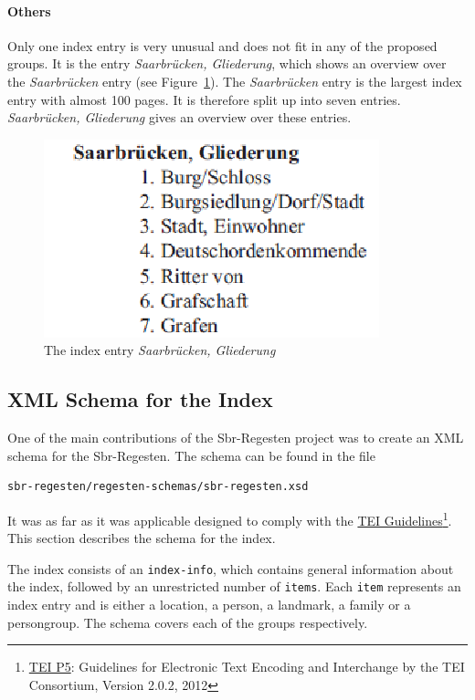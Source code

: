 \paragraph{Others}
\label{sec:other-index-entry}
Only one index entry is very unusual and does not fit in any of the
proposed groups. It is the entry \textit{Saarbrücken, Gliederung},
which shows an overview over the \textit{Saarbrücken} entry (see
Figure~\ref{fig:sb-gliederung}). The \textit{Saarbrücken} entry is the
largest index entry with almost 100 pages. It is therefore split up
into seven entries. \textit{Saarbrücken, Gliederung} gives an overview
over these entries.

\begin{figure}[h]
  \centering
  \includegraphics[scale=0.6]{img/sb-gliederung}
  \caption{The index entry \textit{Saarbrücken, Gliederung}}
  \label{fig:sb-gliederung}
\end{figure}


\subsection{XML Schema for the Index}
\label{sec:index-schema}
One of the main contributions of the Sbr-Regesten project was to
create an XML schema for the Sbr-Regesten. The schema can be found in
the file

\begin{verbatim}
sbr-regesten/regesten-schemas/sbr-regesten.xsd
\end{verbatim}

It was as far as it was applicable designed to comply with the
\href{http://www.tei-c.org/Guidelines/} {TEI
  Guidelines}\footnote{\href{http://www.tei-c.org/Guidelines/P5/index.xml}{TEI
    P5}: Guidelines for Electronic Text Encoding and Interchange by
  the TEI Consortium, Version 2.0.2, 2012}. This section describes the
schema for the index.

The index consists of an \texttt{index-info}, which contains general
information about the index, followed by an unrestricted number of
\texttt{items}. Each \texttt{item} represents an index entry and is
either a location, a person, a landmark, a family or a persongroup.
The schema covers each of the groups respectively.

